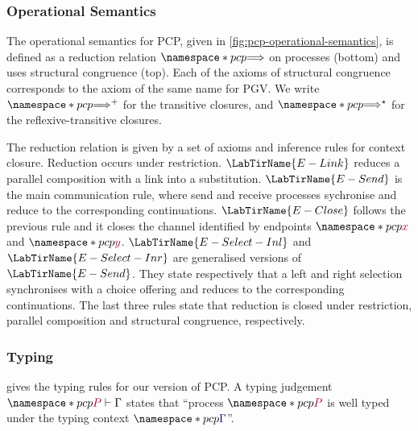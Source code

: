 \subsubsection*{Operational Semantics}
The operational semantics for PCP, given in \cref{fig:pcp-operational-semantics}, is defined as a reduction relation $\pcp{\red}$ on processes (bottom) and uses structural congruence (top). Each of the axioms of structural congruence corresponds to the axiom of the same name for PGV. We write $\pcp{\red^+}$ for the transitive closures, and $\pcp{\red^\star}$ for the reflexive-transitive closures.

The reduction relation is given by a set of axioms and inference rules for context closure. Reduction occurs under restriction. $\LabTirName{E-Link}$ reduces a parallel composition with a link into a substitution. $\LabTirName{E-Send}$ is the main communication rule, where send and receive processes sychronise and reduce to the corresponding continuations. $\LabTirName{E-Close}$ follows the previous rule and it closes the channel identified by endpoints $\pcp{\tm{x}}$ and $\pcp{\tm{y}}$. $\LabTirName{E-Select-Inl}$ and $\LabTirName{E-Select-Inr}$ are generalised versions of $\LabTirName{E-Send}$. They state respectively that a left and right selection synchronises with a choice offering and reduces to the corresponding continuations. The last three rules state that reduction is closed under restriction, parallel composition and structural congruence, respectively.



\subsubsection*{Typing}
 gives the typing rules for our version of PCP. A typing judgement $\pcp{\seq{P}{\Gamma}}$ states that ``process $\pcp{\tm{P}}$ is well typed under the typing context $\pcp{\ty{\Gamma}}$''.




